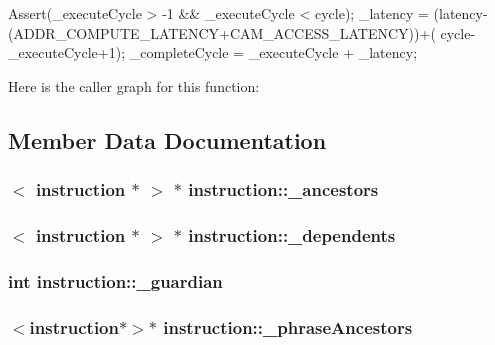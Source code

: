 \begin{DoxyCode}
                                                           {
        Assert(_executeCycle > -1 && _executeCycle < cycle);
        _latency       = (latency-(ADDR_COMPUTE_LATENCY+CAM_ACCESS_LATENCY))+(
      cycle-_executeCycle+1);
        _completeCycle = _executeCycle + _latency;
}
\end{DoxyCode}


Here is the caller graph for this function:




\subsection{Member Data Documentation}
\hypertarget{classinstruction_ac1dd06cf09542ab004237f1dddd1da02}{
\subsubsection[{\_\-ancestors}]{$<$ {\bf instruction} $\ast$ $>$ $\ast$ {\bf instruction::\_\-ancestors}}}
\label{classinstruction_ac1dd06cf09542ab004237f1dddd1da02}
\hypertarget{classinstruction_a50304cae9052c65b138274a96edfbca0}{
\subsubsection[{\_\-dependents}]{$<$ {\bf instruction} $\ast$ $>$ $\ast$ {\bf instruction::\_\-dependents}}}
\label{classinstruction_a50304cae9052c65b138274a96edfbca0}
\hypertarget{classinstruction_a060702a038491fdd3e98661fec166fa4}{
\subsubsection[{\_\-guardian}]{\setlength{\rightskip}{0pt plus 5cm}int {\bf instruction::\_\-guardian}}}
\label{classinstruction_a060702a038491fdd3e98661fec166fa4}
\hypertarget{classinstruction_a728468d228311067d26e390b263dc140}{
\subsubsection[{\_\-phraseAncestors}]{$<${\bf instruction}$\ast$$>$$\ast$ {\bf instruction::\_\-phraseAncestors}}}
